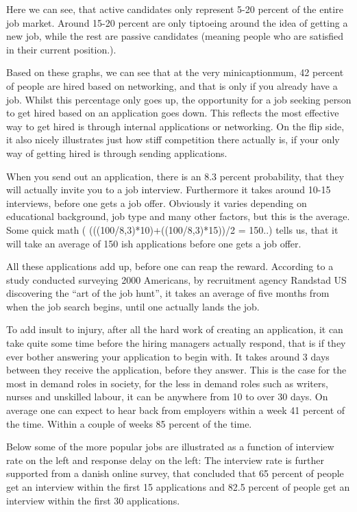 Here we can see, that active candidates only represent 5-20 percent of the
entire job market. Around 15-20 percent are only tiptoeing around the idea
of getting a new job, while the rest are passive candidates (meaning people who are
satisfied in their current position.).

Based on these graphs, we can see that at the very minicaptionmum, 42 percent of people are
hired based on networking, and that is only if you already have a job.
Whilst this percentage only goes up, the opportunity for a job seeking person
to get hired based on an application goes down. This reflects the
most effective way to get hired is through internal applications or networking.
On the flip side, it also nicely illustrates just how stiff competition there actually is,
if your only way of getting hired is through sending applications.

When you send out an application, there is an 8.3 percent probability, that
they will actually invite you to a job interview. Furthermore it takes around
10-15 interviews, before one gets a job offer. Obviously it varies depending
on educational background, job type and many other factors, but this is the average.
Some quick math ( (((100/8,3)*10)+((100/8,3)*15))/2 = 150..) tells us, that it will
take an average of 150 ish applications before one gets a job offer.\cite{HR-sales}

All these applications add up, before one can reap the reward. According to a
study conducted surveying 2000 Americans, by recruitment agency Randstad US
discovering the “art of the job hunt”, it takes an average of five
months from when the job search begins, until one actually lands
the job. \cite{5_month_for_a_job}

To add insult to injury, after all the hard work of creating an application, it can
take quite some time before the hiring managers actually respond, that is if they ever
bother answering your application to begin with.
It takes around 3 days between they receive the application, before they answer.
This is the case for the most in demand roles in society, for the less in demand roles
such as writers, nurses and unskilled labour, it can be anywhere from 10 to over 30 days.\cite{HR-sales}
On average one can expect to hear back from employers within a week 41 percent
of the time. Within a couple of weeks 85 percent of the time.\cite{Hear_back_your_job}

Below some of the more popular jobs are illustrated as a function of interview
rate on the left and response delay on the left:
The interview rate is further supported from a danish online survey, that concluded
that 65 percent of people get an interview within the first 15 applications and
82.5 percent of people get an interview within the first 30 applications.\cite{Amount_of_applications}
\clearpage

